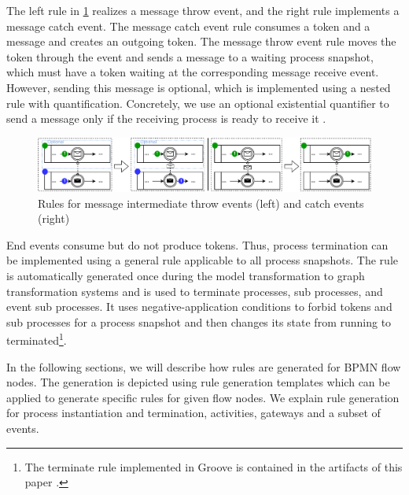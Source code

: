 \documentclass[submission, copyright, creativecommons]{eptcs}
\begin{document}
The left rule in \cref{fig:messageEventRules} realizes a message throw event, and the right rule implements a message catch event.
The message catch event rule consumes a token and a message and creates an outgoing token.
The message throw event rule moves the token through the event and sends a message to a waiting process snapshot, which must have a token waiting at the corresponding message receive event.
However, sending this message is optional, which is implemented using a nested rule with quantification.
Concretely, we use an optional existential quantifier to send a message only if the receiving process is ready to receive it \cite{rensinkNestedQuantificationGraph2006}.

\begin{figure}[h]
    \centering
    \includegraphics[width=1\textwidth]{images/bpmn_semantics-message-events.pdf}
    \caption{Rules for message intermediate throw events (left) and catch events (right)}
    \label{fig:messageEventRules}
\end{figure}

End events consume but do not produce tokens.
Thus, process termination can be implemented using a general rule applicable to all process snapshots.
The rule is automatically generated once during the model transformation to graph transformation systems and is used to terminate processes, sub processes, and event sub processes.
It uses negative-application conditions to forbid tokens and sub processes for a process snapshot and then changes its state from running to terminated\footnote{The terminate rule implemented in Groove is contained in the artifacts of this paper \cite{timkrauterArtifactsTERMGRAPH2022}.}.


In the following sections, we will describe how rules are generated for BPMN flow nodes.
The generation is depicted using rule generation templates which can be applied to generate specific rules for given flow nodes.
We explain rule generation for process instantiation and termination, activities, gateways and a subset of events.
\end{document}
